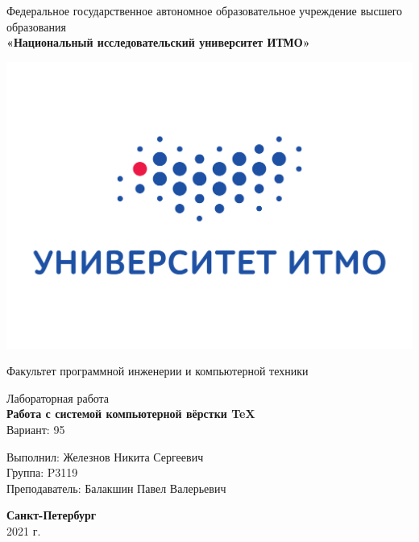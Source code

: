 \thispagestyle{empty}
\begin{center}
     Федеральное государственное автономное образовательное учреждение высшего образования\\
    \textbf{«Национальный исследовательский университет ИТМО»}



    \includegraphics[scale=0.2]{logo.png}

    
    \vspace{1em}
    Факультет программной инженерии и компьютерной техники

    \vspace{20em}

    {\large Лабораторная работа }\\
    {\Large \textbf{Работа с системой компьютерной вёрстки \TeX}}\\[1em]
    Вариант: 95
\end{center}

\vspace{20em}

\begin{flushright}
    Выполнил:
    Железнов Никита Сергеевич\\
    Группа: P3119\\
    Преподаватель:
    Балакшин Павел Валерьевич\\
\end{flushright}

\vspace{\fill}
\vspace{3em}

\begin{center}
{\bf Санкт-Петербург}\\[1em]
2021 г.
\end{center}